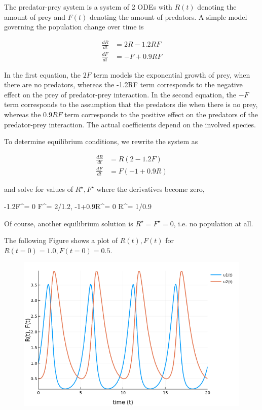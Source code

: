 
The predator-prey system is a system of 2 ODEs with $R(t)$ denoting the amount of prey and $F(t)$ denoting the amount of predators. A simple model governing the population change over time is

\begin{align}\label{2018-07-30-eq1}
\frac{dR}{dt} &= 2R - 1.2RF \nonumber \\
\frac{dF}{dt} &= -F + 0.9RF
\end{align}

In the first equation, the $2F$ term models the exponential growth of prey, when there are no predators, whereas the -1.2RF term corresponds to the negative effect on the prey of predator-prey interaction. In the second equation, the $-F$ term corresponds to the assumption that the predators die when there is no prey, whereas the $0.9RF$ term corresponds to the positive effect on the predators of the predator-prey interaction. The actual coefficients depend on the involved species.

To determine equilibrium conditions, we rewrite the system as

\begin{align*}
\frac{dR}{dt} &= R (2 - 1.2F) \\
\frac{dF}{dt} &= F(-1 + 0.9R)
\end{align*}

and solve for values of $R^\star,F^\star$ where the derivatives become zero,

-1.2F^\star= 0 \rightarrow F^\star = 2/1.2, -1+0.9R^\star = 0 \rightarrow R^\star  = 1/0.9
\eee

Of course, another equilibrium solution is $R^\star= F^\star = 0$, i.e. no population at all.

The following Figure shows a plot of $R(t), F(t)$ for $R(t=0) = 1.0, F(t=0) = 0.5$.

\begin{figure}[H]
	\includegraphics[scale=0.65]{images/ode_04_01.png}
\end{figure}

